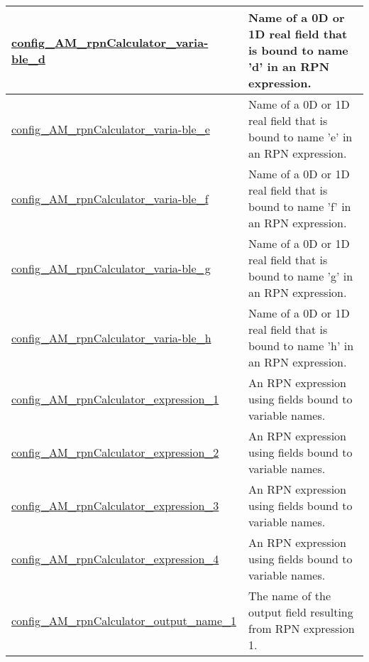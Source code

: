 {\begin{center}
\begin{longtable}{| p{2.0in} || p{4.0in} |}
    \hline
    \hyperref[subsec:nm_sec_config_AM_rpnCalculator_variable_d]{config\_AM\_rpnCalculator\_varia-}\hyperref[subsec:nm_sec_config_AM_rpnCalculator_variable_d]{ble\_d}& Name of a 0D or 1D real field that is bound to name 'd' in an RPN expression. \\
    \hline
    \hyperref[subsec:nm_sec_config_AM_rpnCalculator_variable_e]{config\_AM\_rpnCalculator\_varia-}\hyperref[subsec:nm_sec_config_AM_rpnCalculator_variable_e]{ble\_e}& Name of a 0D or 1D real field that is bound to name 'e' in an RPN expression. \\
    \hline
    \hyperref[subsec:nm_sec_config_AM_rpnCalculator_variable_f]{config\_AM\_rpnCalculator\_varia-}\hyperref[subsec:nm_sec_config_AM_rpnCalculator_variable_f]{ble\_f}& Name of a 0D or 1D real field that is bound to name 'f' in an RPN expression. \\
    \hline
    \hyperref[subsec:nm_sec_config_AM_rpnCalculator_variable_g]{config\_AM\_rpnCalculator\_varia-}\hyperref[subsec:nm_sec_config_AM_rpnCalculator_variable_g]{ble\_g}& Name of a 0D or 1D real field that is bound to name 'g' in an RPN expression. \\
    \hline
    \hyperref[subsec:nm_sec_config_AM_rpnCalculator_variable_h]{config\_AM\_rpnCalculator\_varia-}\hyperref[subsec:nm_sec_config_AM_rpnCalculator_variable_h]{ble\_h}& Name of a 0D or 1D real field that is bound to name 'h' in an RPN expression. \\
    \hline
    \hyperref[subsec:nm_sec_config_AM_rpnCalculator_expression_1]{config\_AM\_rpnCalculator\_expression\_1} & An RPN expression using fields bound to variable names. \\
    \hline
    \hyperref[subsec:nm_sec_config_AM_rpnCalculator_expression_2]{config\_AM\_rpnCalculator\_expression\_2} & An RPN expression using fields bound to variable names. \\
    \hline
    \hyperref[subsec:nm_sec_config_AM_rpnCalculator_expression_3]{config\_AM\_rpnCalculator\_expression\_3} & An RPN expression using fields bound to variable names. \\
    \hline
    \hyperref[subsec:nm_sec_config_AM_rpnCalculator_expression_4]{config\_AM\_rpnCalculator\_expression\_4} & An RPN expression using fields bound to variable names. \\
    \hline
    \hyperref[subsec:nm_sec_config_AM_rpnCalculator_output_name_1]{config\_AM\_rpnCalculator\_output\_name\_1} & The name of the output field resulting from RPN expression 1. \\

\end{longtable}
\end{center}}
